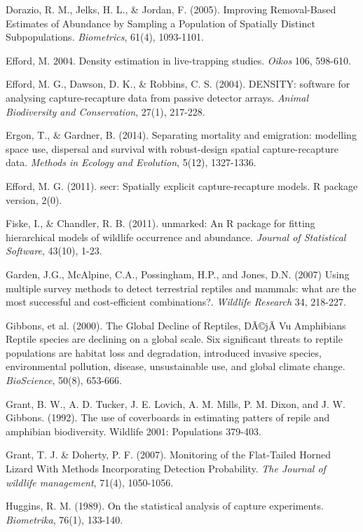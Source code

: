 \documentclass{book}
\begin{document}
\rf Dorazio, R. M., Jelks, H. L., \& Jordan, F. (2005). Improving Removal-Based Estimates of Abundance by Sampling a Population of Spatially Distinct Subpopulations. \textit{Biometrics}, 61(4), 1093-1101.

\rf Efford, M. 2004. Density estimation in live-trapping studies. {\it Oikos}  106, 598-610.

\rf Efford, M. G., Dawson, D. K., \& Robbins, C. S. (2004). DENSITY: software for analysing capture-recapture data from passive detector arrays. \textit{Animal Biodiversity and Conservation}, 27(1), 217-228.

\rf Ergon, T., \& Gardner, B. (2014). Separating mortality and emigration: modelling space use, dispersal and survival with robust-design spatial capture-recapture data. \textit{Methods in Ecology and Evolution}, 5(12), 1327-1336.

\rf Efford, M. G. (2011). secr: Spatially explicit capture-recapture models. R package version, 2(0).

\rf Fiske, I., \& Chandler, R. B. (2011). unmarked: An R package for fitting hierarchical models of wildlife occurrence and abundance. \textit{Journal of Statistical Software}, 43(10), 1-23.

\rf Garden, J.G., McAlpine, C.A., Possingham, H.P., and Jones, D.N. (2007) Using multiple survey methods to detect terrestrial reptiles and mammals: what are the most successful and cost-efficient combinations?. \textit{Wildlife Research} 34, 218-227.

\rf Gibbons, et al. (2000). The Global Decline of Reptiles, DÃ©jÃ  Vu Amphibians Reptile species are declining on a global scale. Six significant threats to reptile populations are habitat loss and degradation, introduced invasive species, environmental pollution, disease, unsustainable use, and global climate change. \textit{BioScience}, 50(8), 653-666.

\rf Grant, B. W., A. D. Tucker, J. E. Lovich, A. M. Mills, P. M. Dixon, and J. W. Gibbons. (1992). The use of coverboards in estimating patters of repile and amphibian biodiversity. Wildlife 2001: Populations 379-403.

\rf Grant, T. J. \& Doherty, P. F. (2007). Monitoring of the Flat-Tailed Horned Lizard With Methods Incorporating Detection Probability. \textit{The Journal of wildlife management}, 71(4), 1050-1056.

\rf Huggins, R. M. (1989). On the statistical analysis of capture experiments. \textit{Biometrika}, 76(1), 133-140.
\end{document}

